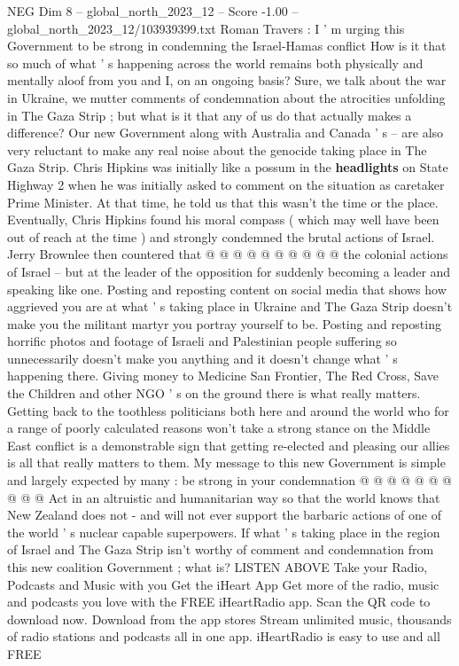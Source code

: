 \begin{textsample}{NEG Dim 8 – global\_north\_2023\_12 – Score -1.00 – global\_north\_2023\_12/103939399.txt}  \label{ex:f8_neg_340}
Roman Travers : I ' m urging this Government to be strong in condemning the Israel-Hamas conflict How is it that so much of what ' s happening across the world remains both physically and mentally aloof from you and I, on an ongoing basis?
Sure, we talk about the war in Ukraine, we mutter comments of condemnation about the atrocities unfolding in The Gaza Strip ; but what is it that any of us do that actually makes a difference?
Our new Government along with Australia and Canada ' s -- are also very reluctant to make any real noise about the genocide taking place in The Gaza Strip.
Chris Hipkins was initially like a possum in the \textbf{headlights} on State Highway 2 when he was initially asked to comment on the situation as caretaker Prime Minister.
At that time, he told us that this wasn't the time or the place.
Eventually, Chris Hipkins found his moral compass ( which may well have been out of reach at the time ) and strongly condemned the brutal actions of Israel.
Jerry Brownlee then countered that @ @ @ @ @ @ @ @ @ @ the colonial actions of Israel -- but at the leader of the opposition for suddenly becoming a leader and speaking like one.
Posting and reposting content on social media that shows how aggrieved you are at what ' s taking place in Ukraine and The Gaza Strip doesn't make you the militant martyr you portray yourself to be.
Posting and reposting horrific photos and footage of Israeli and Palestinian people suffering so unnecessarily doesn't make you anything and it doesn't change what ' s happening there.
Giving money to Medicine San Frontier, The Red Cross, Save the Children and other NGO ' s on the ground there is what really matters.
Getting back to the toothless politicians both here and around the world who for a range of poorly calculated reasons won't take a strong stance on the Middle East conflict is a demonstrable sign that getting re-elected and pleasing our allies is all that really matters to them.
My message to this new Government is simple and largely expected by many : be strong in your condemnation @ @ @ @ @ @ @ @ @ @ Act in an altruistic and humanitarian way so that the world knows that New Zealand does not - and will not ever support the barbaric actions of one of the world ' s nuclear capable superpowers.
If what ' s taking place in the region of Israel and The Gaza Strip isn't worthy of comment and condemnation from this new coalition Government ; what is?
LISTEN ABOVE Take your Radio, Podcasts and Music with you Get the iHeart App Get more of the radio, music and podcasts you love with the FREE iHeartRadio app.
Scan the QR code to download now.
Download from the app stores Stream unlimited music, thousands of radio stations and podcasts all in one app. iHeartRadio is easy to use and all FREE

\end{textsample}
